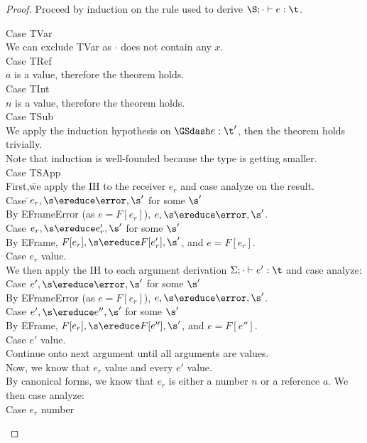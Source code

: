 \documentclass{report}
\begin{document}
\begin{proof}
Proceed by induction on the rule used to derive $\S;\cdot \vdash e : \t$.
\begin{tabbing}
Case \=TVar\\
\> We can exclude TVar as $\cdot$ does not contain any $x$.\\
Case TRef\\
\> $a$ is a value, therefore the theorem holds. \\
Case TInt\\
\> $n$ is a value, therefore the theorem holds. \\
Case TSub\\
\> We apply the induction hypothesis on $\GSdash e : \t'$, then the theorem holds trivially.\\
\> Note that induction is well-founded because the type is getting smaller. \\
Case TSApp\\
\> First,\= we apply the IH to the receiver $e_r$ and case analyze on the result.\\
\> \> Case \=$e_r,\s \ereduce \error,\s'$ for some $\s'$\\
\> \> \> By EFrameError (as $e = F[e_r]$), $e,\s \ereduce \error,\s'$.\\
\> \> Case $e_r,\s \ereduce e'_r,\s'$ for some $\s'$\\
\> \> \> By EFrame, $F[e_r],\s \ereduce F[e_r'],\s'$, and $e = F[e_r]$.\\
\> \> Case $e_r$ value.\\
\> We then apply the IH to each argument derivation $\Sigma;\cdot \vdash e' : \t$ and case analyze:\\
\> \> Case $e',\s \ereduce \error,\s'$ for some $\s'$\\
\> \> \> By EFrameError (as $e = F[e_r]$), $e,\s \ereduce \error,\s'$.\\
\> \> Case $e',\s \ereduce e'',\s'$ for some $\s'$\\
\> \> \> By EFrame, $F[e_r],\s \ereduce F[e''],\s'$, and $e = F[e'']$.\\
\> \> Case $e'$ value.\\
\> \> \> Continue onto next argument until all arguments are values. \\
\> Now, we know that $e_r$ value and every $e'$ value.\\
\> By canonical forms, we know that $e_r$ is either a number $n$ or a reference $a$. We then case analyze:\\
\> \> Case $e_r$ number \\

\end{tabbing}
\end{proof}
\end{document}
